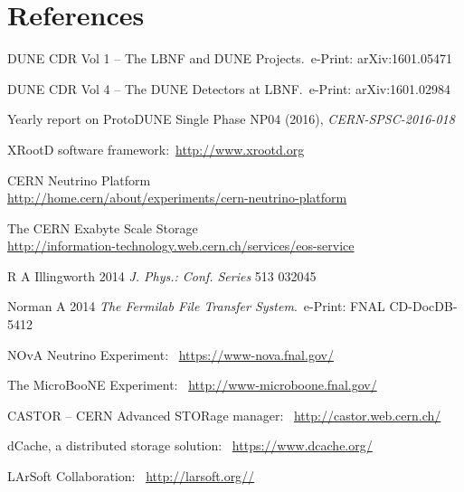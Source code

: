 \documentclass[a4paper]{jpconf}
\begin{document}
\section*{References}
\begin{thebibliography}{9}

 DUNE CDR Vol 1 -- The LBNF and DUNE Projects.~e-Print: arXiv:1601.05471 

 DUNE CDR Vol 4 -- The DUNE Detectors at LBNF.~e-Print: arXiv:1601.02984

Yearly report on ProtoDUNE Single Phase NP04 (2016), \textit{CERN-SPSC-2016-018}

{XRootD software framework:}~\url{http://www.xrootd.org}

{CERN Neutrino Platform}\\
\url{http://home.cern/about/experiments/cern-neutrino-platform}


{The CERN Exabyte Scale Storage}\\
\url{http://information-technology.web.cern.ch/services/eos-service}


R A Illingworth 2014 \textit{J. Phys.: Conf. Series} 513 032045

Norman A 2014 \textit{The Fermilab File Transfer System}.~e-Print: FNAL CD-DocDB-5412

NOvA Neutrino Experiment:~
\url{https://www-nova.fnal.gov/}

The MicroBooNE Experiment:~
\url{http://www-microboone.fnal.gov/}

{CASTOR -- CERN Advanced STORage manager}:~
\url{http://castor.web.cern.ch/}

{dCache, a distributed storage solution:}~
\url{https://www.dcache.org/}

{LArSoft Collaboration}:~
\url{http://larsoft.org//}

\end{thebibliography}
\end{document}
